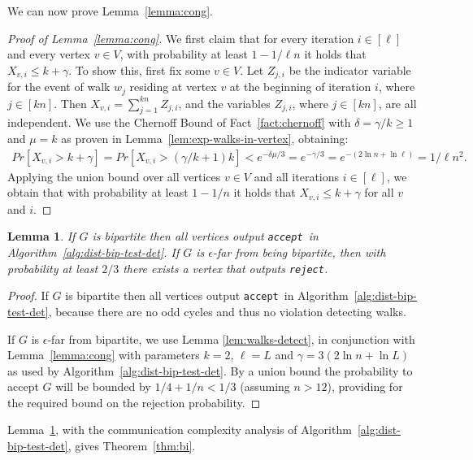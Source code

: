 \documentclass[11pt]{article}
\newtheorem{lemma}[theorem]{Lemma}
\newcommand{\accept}{\texttt{accept}}
\newcommand{\reject}{\texttt{reject}}
\begin{document}
We can now prove Lemma~\ref{lemma:cong}.
\begin{proof}[Proof of Lemma~\ref{lemma:cong}]
We first claim that for every iteration $i \in [\ell]$ and every vertex $v\in V$, with probability at least $1-1/\ell n$ it holds that $X_{v,i} \leq k+\gamma$.
To show this, first fix some $v \in V$.
Let $Z_{j,i}$ be the indicator variable for the event of walk $w_j$ residing at vertex $v$ at the beginning of iteration $i$, where $j\in[k n]$. Then $X_{v,i} = \sum_{j=1}^{k n}Z_{j,i}$, and the variables $Z_{j,i}$, where $j\in[k n]$, are all independent. We use the Chernoff Bound of Fact~\ref{fact:chernoff} with $\delta = \gamma / k \geq 1$ and $\mu = k$ as proven in Lemma~\ref{lem:exp-walks-in-vertex}, obtaining:
\begin{align*}
Pr[X_{v,i} > k + \gamma] = Pr[X_{v,i} > (\gamma / k + 1) k]  < e^{-\delta \mu / 3} = e^{-\gamma / 3} = e^{-(2\ln n + \ln \ell)} = 1/\ell n^2.
\end{align*}
Applying the union bound over all vertices $v\in V$ and all iterations $i\in [\ell]$, we obtain that with probability at least $1-1/n$ it holds that $X_{v,i}\leq k+\gamma$ for all $v$ and $i$.
\end{proof}

\begin{lemma}
\label{lemma:bi-test}
If $G$ is bipartite then all vertices output \accept ~in Algorithm~\ref{alg:dist-bip-test-det}. If $G$ is $\epsilon$-far from being bipartite, then with probability at least $2/3$ there exists a vertex that outputs \reject.
\end{lemma}
\begin{proof}
If $G$ is bipartite then all vertices output \accept ~in Algorithm~\ref{alg:dist-bip-test-det}, because there are no odd cycles and thus no violation detecting walks.

If $G$ is $\epsilon$-far from bipartite, we use Lemma \ref{lem:walks-detect}, in conjunction with Lemma~\ref{lemma:cong} with parameters $k=2$, $\ell=L$ and $\gamma=3(2\ln{n}+\ln{L})$ as used by Algorithm~\ref{alg:dist-bip-test-det}. By a union bound the probability to accept $G$ will be bounded by $1/4+1/n<1/3$ (assuming $n>12$), providing for the required bound on the rejection probability.
\end{proof}

Lemma~\ref{lemma:bi-test}, with the communication complexity analysis of Algorithm~\ref{alg:dist-bip-test-det}, gives Theorem~\ref{thm:bi}.
\end{document}
